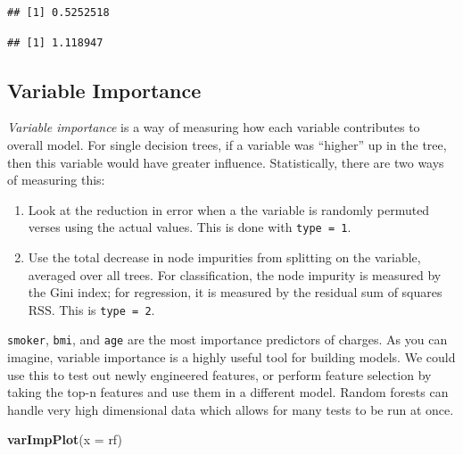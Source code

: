 \documentclass[
  openany]{book}
\newenvironment{Shaded}{\begin{snugshade}}{\end{snugshade}}
\newcommand{\DataTypeTok}[1]{\textcolor[rgb]{0.13,0.29,0.53}{#1}}
\newcommand{\KeywordTok}[1]{\textcolor[rgb]{0.13,0.29,0.53}{\textbf{#1}}}
\newcommand{\NormalTok}[1]{#1}
\newcommand{\OperatorTok}[1]{\textcolor[rgb]{0.81,0.36,0.00}{\textbf{#1}}}
\begin{document}
\begin{verbatim}
## [1] 0.5252518
\end{verbatim}

\begin{Shaded}
\end{Shaded}

\begin{verbatim}
## [1] 1.118947
\end{verbatim}

\hypertarget{variable-importance}{%
\subsection{Variable Importance}\label{variable-importance}}

\emph{Variable importance} is a way of measuring how each variable contributes to overall model. For single decision trees, if a variable was ``higher'' up in the tree, then this variable would have greater influence. Statistically, there are two ways of measuring this:

\begin{enumerate}
\def\labelenumi{\arabic{enumi})}
\item
  Look at the reduction in error when a the variable is randomly permuted verses using the actual values. This is done with \texttt{type\ =\ 1}.
\item
  Use the total decrease in node impurities from splitting on the variable, averaged over all trees. For classification, the node impurity is measured by the Gini index; for regression, it is measured by the residual sum of squares \(\text{RSS}\). This is \texttt{type\ =\ 2}.
\end{enumerate}

\texttt{smoker}, \texttt{bmi}, and \texttt{age} are the most importance predictors of charges. As you can imagine, variable importance is a highly useful tool for building models. We could use this to test out newly engineered features, or perform feature selection by taking the top-n features and use them in a different model. Random forests can handle very high dimensional data which allows for many tests to be run at once.

\begin{Shaded}
\begin{Highlighting}[]
\KeywordTok{varImpPlot}\NormalTok{(}\DataTypeTok{x =}\NormalTok{ rf)}
\end{Highlighting}
\end{Shaded}
\end{document}
